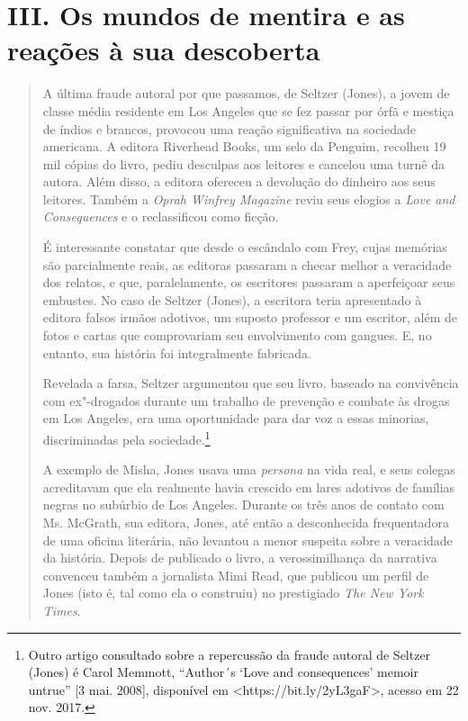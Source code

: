 \section*{III. Os mundos de mentira e as reações à sua descoberta}

\begin{quote}
A última fraude autoral por que passamos, de Seltzer (Jones), a jovem de
classe média residente em Los Angeles que se fez passar por órfã e
mestiça de índios e brancos, provocou uma reação significativa na
sociedade americana. A editora Riverhead Books, um selo da Penguim,
recolheu 19 mil cópias do livro, pediu desculpas aos leitores e cancelou
uma turnê da autora. Além disso, a editora ofereceu a devolução do
dinheiro aos seus leitores. Também a \emph{Oprah Winfrey Magazine} reviu
seus elogios a \emph{Love and Consequences} e o reclassificou como
ficção.

É interessante constatar que desde o escândalo com Frey, cujas memórias
são parcialmente reais, as editoras passaram a checar melhor a
veracidade dos relatos, e que, paralelamente, os escritores passaram a
aperfeiçoar seus embustes. No caso de Seltzer (Jones), a escritora teria
apresentado à editora falsos irmãos adotivos, um suposto professor e um
escritor, além de fotos e cartas que comprovariam seu envolvimento com
gangues. E, no entanto, sua história foi integralmente fabricada.

Revelada a farsa, Seltzer argumentou que seu livro, baseado na
convivência com ex"-drogados durante um trabalho de prevenção e combate
às drogas em Los Angeles, era uma oportunidade para dar voz a essas
minorias, discriminadas pela sociedade.\footnote{Outro artigo consultado
  sobre a repercussão da fraude autoral de Seltzer (Jones) é Carol
  Memmott, ``Author´s `Love and consequences' memoir untrue'' {[}3 mai.
  2008{]}, disponível em \textless{}https://bit.ly/2yL3gaF\textgreater{}, acesso em 22 nov. 2017.}

A exemplo de Misha, Jones usava uma \emph{persona} na vida real, e seus
colegas acreditavam que ela realmente havia crescido em lares adotivos
de famílias negras no subúrbio de Los Angeles. Durante os três anos de
contato com Ms. McGrath, sua editora, Jones, até então a desconhecida
frequentadora de uma oficina literária, não levantou a menor suspeita
sobre a veracidade da história. Depois de publicado o livro, a
verossimilhança da narrativa convenceu também a jornalista Mimi Read,
que publicou um perfil de Jones (isto é, tal como ela o construiu) no
prestigiado \emph{The New York Times}.


\end{quote}
